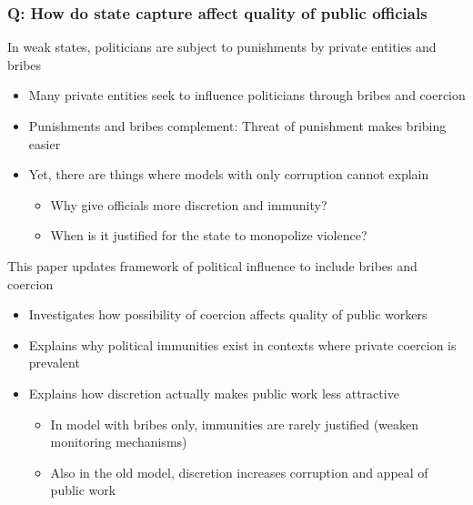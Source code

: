 \documentclass[aspectratio=169]{beamer}
\begin{document}
\begin{frame}
\frametitle{Q: How do state capture affect quality of public officials} 
In weak states, politicians are subject to punishments by private entities and bribes
\begin{itemize}\setlength\itemsep{3pt}
  \item Many private entities seek to influence politicians through bribes and coercion
\item Punishments and bribes complement: Threat of punishment makes bribing easier
\item Yet, there are things where models with only corruption cannot explain
\begin{itemize}
\item Why give officials more discretion and immunity?
\item When is it justified for the state to monopolize violence?
\end{itemize}
\end{itemize}\medskip
This paper updates framework of political influence to include bribes and coercion
\begin{itemize}\setlength\itemsep{3pt}
\item Investigates how possibility of coercion affects quality of public workers 
\item Explains why political immunities exist in contexts where private coercion is prevalent
\item Explains how discretion actually makes public work less attractive
\begin{itemize}\setlength\itemsep{3pt}
\item In model with bribes only, immunities are rarely justified (weaken monitoring mechanisms)
\item Also in the old model, discretion increases corruption and appeal of public work
\end{itemize}
\end{itemize}
\end{frame}
\end{document}
